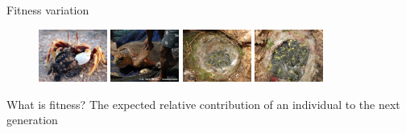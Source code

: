 \documentclass[10pt]{beamer}%
\begin{document}
\begin{frame}{Fitness variation}
	\begin{figure}
		\includegraphics[width=0.2\textwidth,height=0.15\textwidth]{Figures/babyTurtle} \hspace{1pt}
		\includegraphics[width=0.2\textwidth,height=0.15\textwidth]{Figures/adultTurtle}
		\vspace{1pt}
		\includegraphics[width=0.2\textwidth,height=0.15\textwidth]{Figures/BlueTits2}\hspace{1pt}
		\includegraphics[width=0.2\textwidth,height=0.15\textwidth]{Figures/BlueTits8}
	\end{figure}
	
	\begin{alertblock}{What is fitness?}
		The expected relative contribution of an individual to the next generation
	\end{alertblock}
\end{frame}
\end{document}
